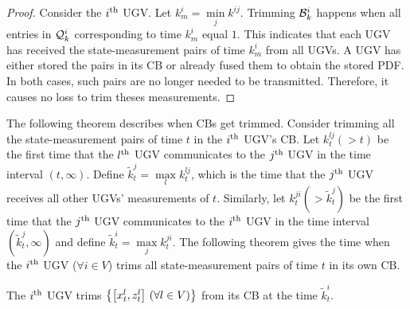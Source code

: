 	\begin{proof}
		
		Consider the $i^\text{th}$ UGV. Let $k^i_m=\min\limits_j k^{ij}$. 
		Trimming $\mathcal{B}^i_k$ happens when all entries in $\mathcal{Q}^i_k$ corresponding to time $k^i_m$ equal $1$. 
		This indicates that each UGV has received the state-measurement pairs of time $k^i_m$ from all UGVs.
		A UGV has either stored the pairs in its CB or already fused them to obtain the stored PDF.
		In both cases, such pairs are no longer needed to be transmitted. %
		Therefore, it causes no loss to trim theses measurements.		
	\end{proof}
	
	The following theorem describes when CBs get trimmed.
	Consider trimming all the state-measurement pairs of time $t$ in the $i^\text{th}$ UGV's CB.
	Let $k^{lj}_t (>t)$ be the first time that the $l^\text{th}$ UGV communicates to the $j^\text{th}$ UGV in the time interval $(t,\infty)$.
	Define $\tilde{k}^j_t=\max\limits_l k^{lj}_t$, which is the time that the $j^\text{th}$ UGV receives all other UGVs' measurements of $t$.
	Similarly, let $k^{ji}_t (> \tilde{k}^j_t)$ be the first time that the $j^\text{th}$ UGV communicates to the $i^\text{th}$ UGV in the time interval $(\tilde{k}^j_t,\infty)$ and define $\tilde{k}^i_t=\max\limits_j k^{ji}_t$.
	The following theorem gives the time when the $i^\text{th}$ UGV ($\forall i\in V$) trims all state-measurement pairs of time $t$ in its own CB.
	\begin{thm}\label{thm:upd_tl_freq}		
		The $i^\text{th}$ UGV trims $\left\lbrace\left[x^l_t,z^l_t\right] \,(\forall l\in V)\right\rbrace$ from its CB at the time $\tilde{k}^i_t$.
	\end{thm}
	

